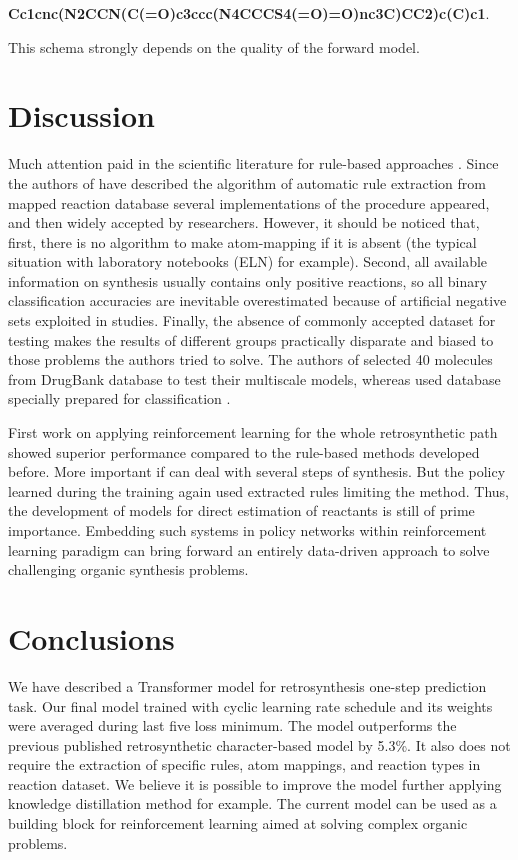 \documentclass{article}
\begin{document}
\textbf{Cc1cnc(N2CCN(C(=O)c3ccc(N4CCCS4(=O)=O)nc3C)CC2)c(C)c1}.

This schema strongly depends on the quality of the forward model. 


\section{Discussion}

Much attention paid in the scientific literature for rule-based approaches \cite{Preuss,Baylon}. Since the authors of \cite{Rules} have described the algorithm of automatic rule extraction from mapped reaction database several implementations of the procedure appeared, and then widely accepted by researchers. However, it should be noticed that, first, there is no algorithm to make atom-mapping \cite{BaskinReview} if it is absent (the typical situation with laboratory notebooks (ELN) for example). Second, all available information on synthesis usually contains only positive reactions, so all binary classification accuracies are inevitable overestimated because of artificial negative sets exploited in studies. Finally, the absence of commonly accepted dataset for testing makes the results of different groups practically disparate and  biased to those problems the authors tried to solve. The authors of \cite{Baylon} selected 40 molecules from DrugBank database to test their multiscale models, whereas \cite{Pande} used database specially prepared for classification \cite{Schneider}.  

First work on applying reinforcement learning for the whole retrosynthetic path \cite{Preuss} showed superior performance compared to the rule-based methods developed before. More important if can deal with several steps of synthesis. But the policy learned during the training again used extracted rules limiting the method. Thus, the development of models for direct estimation of reactants is still of prime importance. Embedding such systems in policy networks within reinforcement learning paradigm can bring forward an entirely data-driven approach to solve challenging organic synthesis problems.

\section{Conclusions}

We have described a Transformer model for retrosynthesis one-step prediction task. Our final model trained with cyclic learning rate schedule and its weights were averaged during last five loss minimum. The model outperforms the previous published retrosynthetic character-based model by 5.3\%. It also does not require the extraction of specific rules, atom mappings, and reaction types in reaction dataset. We believe it is possible to improve the model further applying knowledge distillation method \cite{Hinton} for example. The current model can be used as a building block for reinforcement learning aimed at solving complex organic problems.
\end{document}
